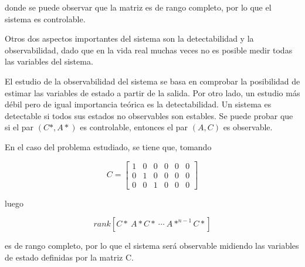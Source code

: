 donde se puede observar que la matriz es de rango completo, por lo que el sistema es controlable.


Otros dos aspectos importantes del sistema son la detectabilidad y la observabilidad, dado que en la vida real muchas veces no es posible medir todas las variables del sistema. 

El estudio de la observabilidad del sistema se basa en comprobar la posibilidad de estimar las variables de estado a partir de la salida. Por otro lado, un estudio más débil pero de igual importancia teórica es la detectabilidad. Un sistema es detectable si todos sus estados no observables son estables. Se puede probar que si el par $(C*,A*)$ es controlable, entonces el par $(A,C)$ es observable. 

En el caso del problema estudiado, se tiene que, tomando

\begin{equation}
C = 	\begin{bmatrix}
1 & 0 & 0 & 0 & 0 & 0\\
0 & 1 & 0 & 0 & 0 & 0\\
0 & 0 & 1 & 0 & 0 & 0
\end{bmatrix}
\end{equation}

luego

\begin{equation}
rank[C* \ A*C* \ \cdots \ A*^{n-1}C*]
\end{equation}

es de rango completo, por lo que el sistema será observable midiendo las variables de estado definidas por la matriz C.




%